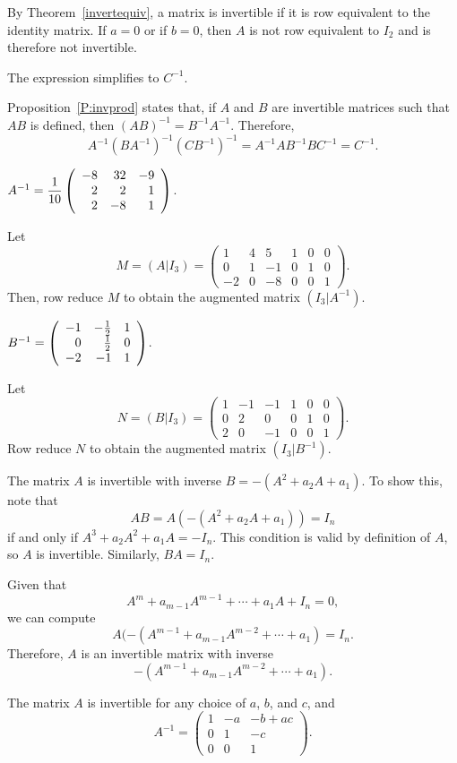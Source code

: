 \documentclass{ximera}
\begin{document}
\soln By Theorem~\ref{invertequiv}, a matrix is invertible if it is row
equivalent to the identity matrix.  If $a = 0$ or if $b = 0$, then
$A$ is not row equivalent to $I_2$ and is therefore not invertible.

\ans The expression simplifies to $C^{-1}$.

\soln Proposition~\ref{P:invprod} states that, if $A$ and $B$ are
invertible matrices such that $AB$ is defined, then $(AB)^{-1} =
B^{-1}A^{-1}$.  Therefore,
\[
A^{-1}(BA^{-1})^{-1}(CB^{-1})^{-1} = A^{-1}AB^{-1}BC^{-1} = C^{-1}.
\]

 \ans
$A^{-1} = \displaystyle\frac{1}{10}\left(\begin{array}{rrr} -8 & 32 & -9 \\ 2 & 2 & 1 \\ 2 & -8 & 1\end{array}\right)$.

\soln Let
\[
M = (A|I_3) = \left(\begin{array}{rrr|rrr} 1 & 4 & 5 & 1 & 0 & 0 \\
0 & 1 & -1 & 0 & 1 & 0 \\
-2 & 0 & -8 & 0 & 0 & 1 \end{array}\right).
\]
Then, row reduce $M$ to obtain the augmented matrix $(I_3|A^{-1})$.

 \ans
$B^{-1} = \left(\begin{array}{rrr} -1 & -\frac{1}{2} & 1 \\ 0 & \frac{1}{2} & 0 \\ -2 & -1 & 1\end{array}\right)$.

\soln Let
\[
N = (B|I_3) = \left(\begin{array}{rrr|rrr} 1 & -1 & -1 & 1 & 0 & 0 \\
0 & 2 & 0 & 0 & 1 & 0 \\ 2 & 0 & -1 & 0 & 0 & 1 \end{array}\right).
\]
Row reduce $N$ to obtain the augmented matrix $(I_3|B^{-1})$.

The matrix $A$ is invertible with inverse $B = -(A^2 + a_2A + a_1)$.
To show this, note that
\[ AB = A(-(A^2 + a_2A + a_1)) = I_n \]
if and only if $A^3 + a_2A^2 + a_1A = -I_n$.  This condition is valid
by definition of $A$, so $A$ is invertible.  Similarly, $BA = I_n$.

Given that
\[
A^m + a_{m - 1}A^{m - 1} + \cdots + a_1A + I_n = 0,
\]
we can compute
\[
A(-(A^{m - 1} + a_{m - 1}A^{m - 2} + \cdots + a_1) = I_n.
\]
Therefore, $A$ is an invertible matrix with inverse
\[
-(A^{m - 1} + a_{m - 1}A^{m - 2} + \cdots + a_1).
\]

\ans
The matrix $A$ is invertible for any choice of $a$, $b$, and $c$, and
\[
A^{-1} = \left(\begin{array}{rrc} 1 & -a & -b + ac \\ 0 & 1 & -c 
\\ 0 & 0 & 1 \end{array}\right).
\]
\end{document}
